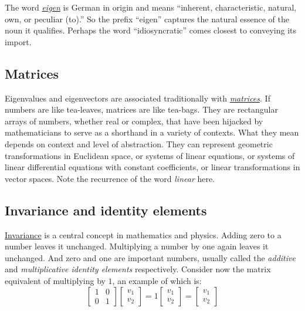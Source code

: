 \documentclass[
  12pt,
  a4paper,
]{article}
\begin{document}
The word
\href{https://en.wikipedia.org/wiki/Talk:Eigenvector}{\emph{eigen}} is
German in origin and means ``inherent, characteristic, natural, own, or
peculiar (to).'' So the prefix ``eigen'' captures the natural essence of
the noun it qualifies. Perhaps the word ``idiosyncratic'' comes closest
to conveying its import.

\hypertarget{matrices}{%
\subsection{Matrices}\label{matrices}}

Eigenvalues and eigenvectors are associated traditionally with
\href{https://en.wikipedia.org/wiki/Matrix_\%28mathematics\%29}{\emph{matrices}}.
If numbers are like tea-leaves, matrices are like tea-bags. They are
rectangular arrays of numbers, whether real or complex, that have been
hijacked by mathematicians to serve as a shorthand in a variety of
contexts. What they mean depends on context and level of abstraction.
They can represent geometric transformations in Euclidean space, or
systems of linear equations, or systems of linear differential equations
with constant coefficients, or linear transformations in vector spaces.
Note the recurrence of the word \emph{linear} here.

\hypertarget{invariance-and-identity-elements}{%
\subsection{Invariance and identity
elements}\label{invariance-and-identity-elements}}

\href{http://mathworld.wolfram.com/Invariant.html}{Invariance} is a
central concept in mathematics and physics. Adding zero to a number
leaves it unchanged. Multiplying a number by one again leaves it
unchanged. And zero and one are important numbers, usually called the
\emph{additive} and \emph{multiplicative identity elements}
respectively. Consider now the matrix equivalent of multiplying by
\(1\), an example of which is: \begin{equation}
\begin{bmatrix}1 & 0\\0 & 1\end{bmatrix}\begin{bmatrix}v_{1}\\v_{2}\end{bmatrix}
= 1\begin{bmatrix}v_{1}\\v_{2}\end{bmatrix} = \begin{bmatrix}v_{1}\\v_{2}\end{bmatrix}
\label{eq:identity}\end{equation}
\end{document}
